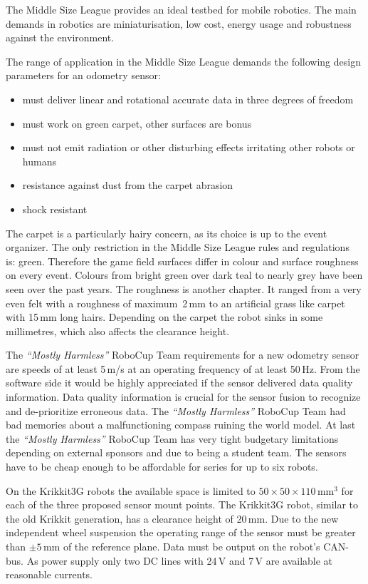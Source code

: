 \documentclass[12pt,a4paper]{article}
\newcommand{\MH}{\emph{``Mostly Harmless''} RoboCup Team\xspace}
\newcommand{\MSL}{Middle Size League\xspace}
\begin{document}
The \MSL provides an ideal testbed for mobile robotics.
The main demands in robotics are miniaturisation, low cost, energy usage and robustness against the environment.

The range of application in the \MSL demands the following design parameters for an odometry sensor: %
\begin{itemize}
  \item must deliver linear and rotational accurate data in three degrees of freedom
  \item must work on green carpet, other surfaces are bonus
  \item must not emit radiation or other disturbing effects irritating other robots or humans
  \item resistance against dust from the carpet abrasion
  \item shock resistant
\end{itemize}

The carpet is a particularly hairy concern, as its choice is up to the event organizer.
The only restriction in the \MSL rules and regulations~\cite{msl-rules} is: green.
Therefore the game field surfaces differ in colour and surface roughness on every event.
Colours from bright green over dark teal to nearly grey have been seen over the past years.
The roughness is another chapter.
It ranged from a very even felt with a roughness of maximum~2\,mm to an artificial grass like carpet with 15\,mm long hairs. 
Depending on the carpet the robot sinks in some millimetres, which also affects the clearance height.

The \MH requirements for a new odometry sensor are speeds of at least 5\,m/s at an operating frequency of at least 50\,Hz.
From the software side it would be highly appreciated if the sensor delivered data quality information.
Data quality information is crucial for the sensor fusion to recognize and de-prioritize erroneous data.
The \MH had bad memories about a malfunctioning compass ruining the world model.
At last the \MH has very tight budgetary limitations depending on external sponsors and due to being a student team.
The sensors have to be cheap enough to be affordable for series for up to six robots.


On the Krikkit3G robots the available space is limited to $50\times50\times110$\,mm$^3$ for each of the three proposed sensor mount points.
The Krikkit3G robot, similar to the old Krikkit generation, has a clearance height of 20\,mm.
Due to the new independent wheel suspension the operating range of the sensor must be greater than $\pm 5$\,mm of the reference plane.
Data must be output on the robot's CAN-bus.
As power supply only two DC lines with 24\,V and 7\,V are available at reasonable currents.
\end{document}
